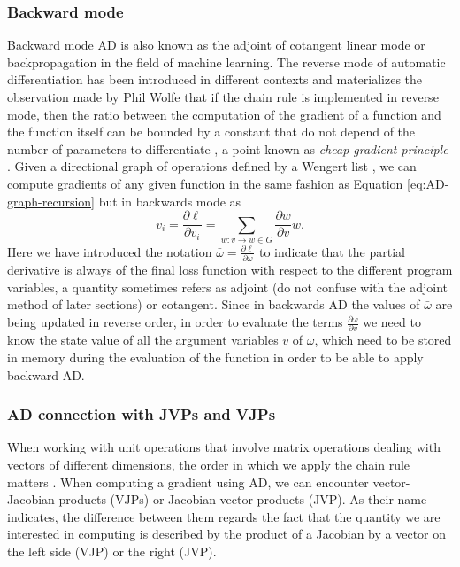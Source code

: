 \subsubsection{Backward mode}

Backward mode AD is also known as the adjoint of cotangent linear mode or backpropagation in the field of machine learning. 
The reverse mode of automatic differentiation has been introduced in different contexts \cite{griewank2012invented} and materializes the observation made by Phil Wolfe that if the chain rule is implemented in reverse mode, then the ratio between the computation of the gradient of a function and the function itself can be bounded by a constant that do not depend of the number of parameters to differentiate \cite{Griewack-on-AD, Wolfe_1982}, a point known as \textit{cheap gradient principle} \cite{griewank2012invented}.  
Given a directional graph of operations defined by a Wengert list \cite{Wengert_1964}, we can compute gradients of any given function in the same fashion as Equation \eqref{eq:AD-graph-recursion} but in backwards mode as
\begin{equation}
 \bar v_i = \frac{\partial \ell}{\partial v_i}= \sum_{w : v \rightarrow w \in G} \frac{\partial w}{\partial v} \bar{w}.
\end{equation}
Here we have introduced the notation $\bar{\omega} = \frac{\partial \ell}{\partial \omega}$ to indicate that the partial derivative is always of the final loss function with respect to the different program variables, a quantity sometimes refers as adjoint (do not confuse with the adjoint method of later sections) or cotangent. 
Since in backwards AD the values of $\bar \omega$ are being updated in reverse order, in order to evaluate the terms $\frac{\partial \omega}{\partial v}$ we need to know the state value of all the argument variables $v$ of $\omega$, which need to be stored in memory during the evaluation of the function in order to be able to apply backward AD.


\subsubsection{AD connection with JVPs and VJPs}
\label{sec:vjp-jvp}

When working with unit operations that involve matrix operations dealing with vectors of different dimensions, the order in which we apply the chain rule matters \cite{Giering_Kaminski_1998}.
When computing a gradient using AD, we can encounter vector-Jacobian products (VJPs) or Jacobian-vector products (JVP).
As their name indicates, the difference between them regards the fact that the quantity we are interested in computing is described by the product of a Jacobian by a vector on the left side (VJP) or the right (JVP).

